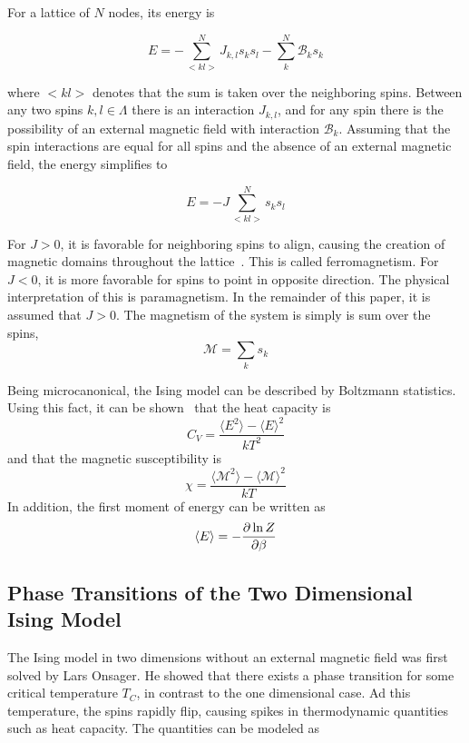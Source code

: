 \documentclass[aps,reprint]{revtex4-1}
\newcommand{\mean}[1]{\langle #1 \rangle}
\begin{document}
For a lattice of \(N\) nodes, its energy is

\begin{equation}
  \label{eq:2}
 E = -\sum_{<kl>}^{N}J_{k,l}s_{k}s_{l} - \sum_{k}^{N}\mathcal{B}_{k}s_{k}
\end{equation}

where \(<kl>\) denotes that the sum is taken over the neighboring spins.
Between any two spins \(k, l \in \Lambda\) there is an interaction \(J_{k,l}\),
and for any spin there is the possibility of an external magnetic field with
interaction \(\mathcal{B}_{k}\). Assuming that the spin interactions are equal
for all spins and the absence of an external magnetic field, the energy
simplifies to

\begin{equation}
  \label{eq:3}
  E = -J\sum_{<kl>}^{N}s_{k}s_{l}
\end{equation}

For \(J>0\), it is favorable for neighboring spins to align, causing the
creation of magnetic domains throughout the lattice~\cite{physicslectures}.
This is called ferromagnetism. For \(J<0\), it is more favorable for spins to
point in opposite direction. The physical interpretation of this is
paramagnetism. In the remainder of this paper, it is assumed that \(J>0\).
The magnetism of the system is simply is sum over the spins,
\begin{equation}
  \label{eq:1}
  \mathcal{M} = \sum_{k} s_{k}
\end{equation}

Being microcanonical, the Ising model can be described by Boltzmann statistics.
Using this fact, it can be shown~\cite{physicslectures} that the heat capacity is
\begin{equation}
  \label{eq:4}
  C_V = \frac{\mean{E^2} - \mean{E}^2}{kT^2}
\end{equation}
and that the magnetic susceptibility is
\begin{equation}
  \label{eq:5}
  \chi = \frac{\mean{\mathcal{M}^2} - \mean{\mathcal{M}}^2}{kT}
\end{equation}
In addition, the first moment of energy can be written as
\begin{equation}
  \label{eq:6}
  \mean{E} = - \pdv{\ln{Z}}{\beta}
\end{equation}

\subsection{Phase Transitions of the Two Dimensional Ising Model}
\label{sec:phase-trans-two}
The Ising model in two dimensions without an external magnetic field was first
solved by Lars Onsager. He showed that there exists a phase transition for some
critical temperature \(T_{C}\), in contrast to the one dimensional case. Ad this
temperature, the spins rapidly flip, causing spikes in thermodynamic quantities such as
heat capacity. The quantities can be modeled as~\cite{project3}
\end{document}

